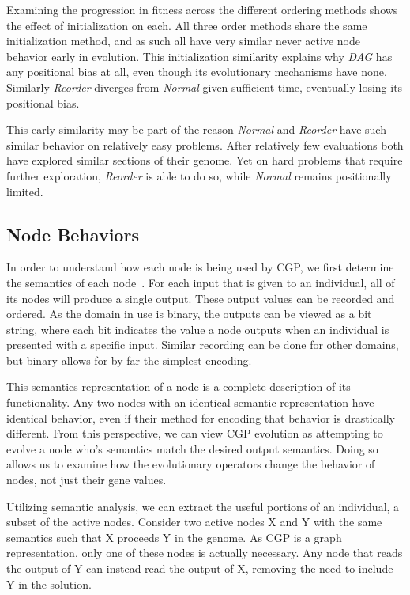 \documentclass[journal]{IEEEtran}
\begin{document}
Examining the progression in fitness across the different ordering methods shows
the effect of initialization on each.  All three order methods share the same initialization
method, and as such all have very similar never active node behavior early in
evolution.  This initialization similarity explains why \emph{DAG} has any positional
bias at all, even though its evolutionary mechanisms have none.  Similarly \emph{Reorder}
diverges from \emph{Normal} given sufficient time, eventually losing its positional
bias.

This early similarity may be part of the reason \emph{Normal} and \emph{Reorder}
have such similar behavior on relatively easy problems.  After relatively few
evaluations both have explored similar sections of their genome.  Yet on hard
problems that require further exploration, \emph{Reorder} is able to do so, while
\emph{Normal} remains positionally limited.

\subsection{Node Behaviors}

In order to understand how each node is being used by CGP,
we first determine the semantics of each node~\cite{mcphee:2008:treesemantics}.
For each input that is given to an individual, all of its nodes
will produce a single output.  These output values can be recorded and ordered.
As the domain in use is binary, the outputs can be viewed as a bit string, where
each bit indicates the value a node outputs when an individual is presented with a
specific input.  Similar recording can be done for other domains, but binary
allows for by far the simplest encoding.

This semantics representation of a node is a complete description of its functionality.
Any two nodes with an identical semantic representation have identical behavior,
even if their method for encoding that behavior is drastically different.  From
this perspective, we can view CGP evolution as attempting to evolve a node who's
semantics match the desired output semantics.  Doing so allows
us to examine how the evolutionary operators change the behavior of nodes,
not just their gene values.

Utilizing semantic analysis, we can extract the useful
portions of an individual, a subset of the active nodes.  Consider two active
nodes X and Y with the same semantics such that X proceeds Y in the genome.
As CGP is a graph representation, only
one of these nodes is actually necessary.  Any node that reads the output of Y
can instead read the output of X, removing the need to include Y in the solution.
\end{document}
